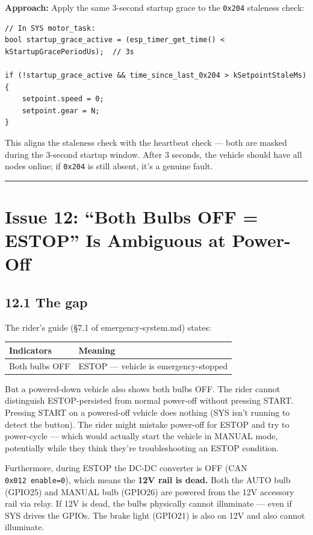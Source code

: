 \documentclass[12pt,a4paper,oneside]{report}
\begin{document}
\textbf{Approach:} Apply the same 3-second startup grace to the \texttt{0x204}
staleness check:

\begin{verbatim}
// In SYS motor_task:
bool startup_grace_active = (esp_timer_get_time() < kStartupGracePeriodUs);  // 3s

if (!startup_grace_active && time_since_last_0x204 > kSetpointStaleMs) {
    setpoint.speed = 0;
    setpoint.gear = N;
}
\end{verbatim}

This aligns the staleness check with the heartbeat check --- both are masked
during the 3-second startup window. After 3 seconds, the vehicle should have all
nodes online; if \texttt{0x204} is still absent, it's a genuine fault.

\begin{center}\rule{0.5\linewidth}{0.5pt}\end{center}

\section{Issue 12: ``Both Bulbs OFF = ESTOP'' Is Ambiguous at
Power-Off}\label{issue-12-both-bulbs-off-estop-is-ambiguous-at-power-off}

\subsection{12.1 The gap}\label{the-gap-5}

The rider's guide (§7.1 of emergency-system.md) states:

\begin{longtable}[]{@{}ll@{}}
\toprule\noalign{}
Indicators & Meaning \\
\midrule\noalign{}
\endhead
\bottomrule\noalign{}
\endlastfoot
Both bulbs OFF & ESTOP --- vehicle is emergency-stopped \\
\end{longtable}

But a powered-down vehicle also shows both bulbs OFF. The rider cannot
distinguish ESTOP-persisted from normal power-off without pressing START.
Pressing START on a powered-off vehicle does nothing (SYS isn't running to
detect the button). The rider might mistake power-off for ESTOP and try to
power-cycle --- which would actually start the vehicle in MANUAL mode,
potentially while they think they're troubleshooting an ESTOP condition.

Furthermore, during ESTOP the DC-DC converter is OFF (CAN
\texttt{0x012\ enable=0}), which means the \textbf{12V rail is dead.} Both the
AUTO bulb (GPIO25) and MANUAL bulb (GPIO26) are powered from the 12V accessory
rail via relay. If 12V is dead, the bulbs physically cannot illuminate --- even
if SYS drives the GPIOs. The brake light (GPIO21) is also on 12V and also cannot
illuminate.
\end{document}
